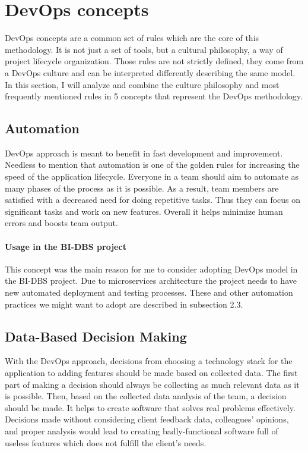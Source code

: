 \section{DevOps concepts} DevOps concepts are a common set of rules which are the core of this methodology. It is not just a set of tools, but a cultural philosophy, a way of project lifecycle organization. Those rules are not strictly defined, they come from a DevOps culture and can be interpreted differently describing the same model. In this section, I will analyze and combine the culture philosophy and most frequently mentioned rules\cite{devops-conc1, devops-conc2} in 5 concepts that represent the DevOps methodology.

\subsection{Automation} DevOps approach is meant to benefit in fast development and improvement. Needless to mention that automation is one of the golden rules for increasing the speed of the application lifecycle. Everyone in a team should aim to automate as many phases of the process as it is possible. As a result, team members are satisfied with a decreased need for doing repetitive tasks. Thus they can focus on significant tasks and work on new features. Overall it helps minimize human errors and boosts team output.

\paragraph*{Usage in the BI-DBS project} This concept was the main reason for me to consider adopting DevOps model in the BI-DBS project. Due to microservices architecture the project needs to have new automated deployment and testing processes. These and other automation practices we might want to adopt are described in subsection 2.3.


\subsection{Data-Based Decision Making} With the DevOps approach, decisions from choosing a technology stack for the application to adding features should be made based on collected data. The first part of making a decision should always be collecting as much relevant data as it is possible. Then, based on the collected data analysis of the team, a decision should be made. It helps to create software that solves real problems effectively. Decisions made without considering client feedback data, colleagues' opinions, and proper analysis would lead to creating badly-functional software full of useless features which does not fulfill the client's needs.

